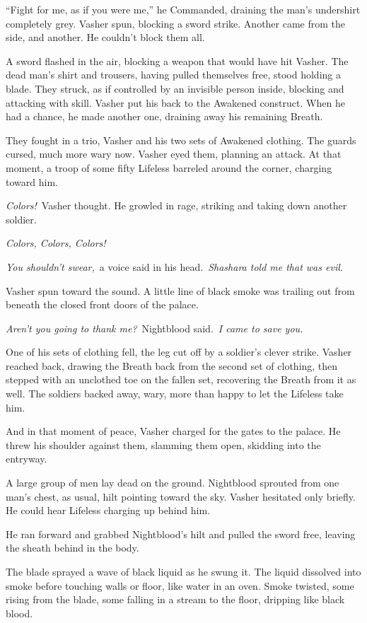 “Fight for me, as if you were me,” he Commanded, draining the man’s undershirt completely grey. Vasher spun, blocking a sword strike. Another came from the side, and another. He couldn’t block them all.

A sword flashed in the air, blocking a weapon that would have hit Vasher. The dead man’s shirt and trousers, having pulled themselves free, stood holding a blade. They struck, as if controlled by an invisible person inside, blocking and attacking with skill. Vasher put his back to the Awakened construct. When he had a chance, he made another one, draining away his remaining Breath.

They fought in a trio, Vasher and his two sets of Awakened clothing. The guards cursed, much more wary now. Vasher eyed them, planning an attack. At that moment, a troop of some fifty Lifeless barreled around the corner, charging toward him.

\textit{Colors!}~Vasher thought. He growled in rage, striking and taking down another soldier.

\textit{Colors, Colors, Colors!}

\textit{You shouldn’t swear,}~a voice said in his head.~\textit{Shashara told me that was evil.}

Vasher spun toward the sound. A little line of black smoke was trailing out from beneath the closed front doors of the palace.

\textit{Aren’t you going to thank me?}~Nightblood said.~\textit{I came to save you.}

One of his sets of clothing fell, the leg cut off by a soldier’s clever strike. Vasher reached back, drawing the Breath back from the second set of clothing, then stepped with an unclothed toe on the fallen set, recovering the Breath from it as well. The soldiers backed away, wary, more than happy to let the Lifeless take him.

And in that moment of peace, Vasher charged for the gates to the palace. He threw his shoulder against them, slamming them open, skidding into the entryway.

A large group of men lay dead on the ground. Nightblood sprouted from one man’s chest, as usual, hilt pointing toward the sky. Vasher hesitated only briefly. He could hear Lifeless charging up behind him.

He ran forward and grabbed Nightblood’s hilt and pulled the sword free, leaving the sheath behind in the body.

The blade sprayed a wave of black liquid as he swung it. The liquid dissolved into smoke before touching walls or floor, like water in an oven. Smoke twisted, some rising from the blade, some falling in a stream to the floor, dripping like black blood.

